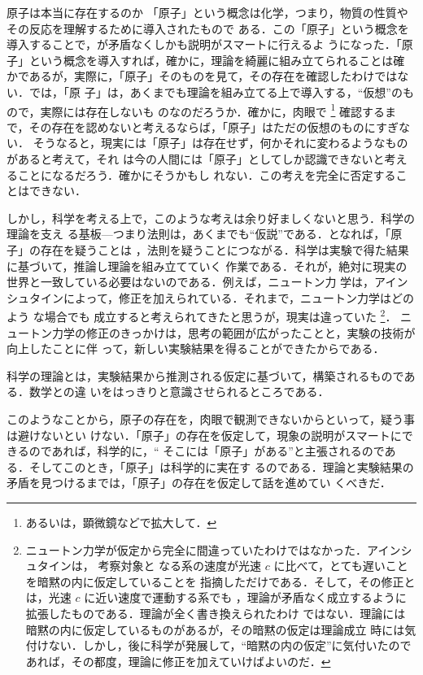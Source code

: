         \begin{memo}{原子は本当に存在するのか}
            「原子」という概念は化学，つまり，物質の性質やその反応を理解するために導入されたもので
            ある．この「原子」という概念を導入することで，が矛盾なくしかも説明がスマートに行えるよ
            うになった．「原子」という概念を導入すれば，確かに，理論を綺麗に組み立てられることは確
            かであるが，実際に，「原子」そのものを見て，その存在を確認したわけではない．では，「原
            子」は，あくまでも理論を組み立てる上で導入する，“仮想”のもので，実際には存在しないも
            のなのだろうか．確かに，肉眼で
                \footnote{
                    あるいは，顕微鏡などで拡大して．
                }
            確認するまで，その存在を認めないと考えるならば，「原子」はただの仮想のものにすぎない．
            そうなると，現実には「原子」は存在せず，何かそれに変わるようなものがあると考えて，それ
            は今の人間には「原子」としてしか認識できないと考えることになるだろう．確かにそうかもし
            れない．この考えを完全に否定することはできない．

            しかし，科学を考える上で，このような考えは余り好ましくないと思う．科学の理論を支え
            る基板---つまり法則は，あくまでも“仮説”である．となれば，「原子」の存在を疑うことは
            ，法則を疑うことにつながる．科学は実験で得た結果に基づいて，推論し理論を組み立てていく
            作業である．それが，絶対に現実の世界と一致している必要はないのである．例えば，ニュートン力
            学は，アインシュタインによって，修正を加えられている．それまで，ニュートン力学はどのよう
            な場合でも
            成立すると考えられてきたと思うが，現実は違っていた
                \footnote{
                    ニュートン力学が仮定から完全に間違っていたわけではなかった．アインシュタインは，
                    考察対象と
                    なる系の速度が光速 $c$ に比べて，とても遅いことを暗黙の内に仮定していることを
                    指摘しただけである．そして，その修正とは，光速 $c$ に近い速度で運動する系でも
                    ，理論が矛盾なく成立するように拡張したものである．理論が全く書き換えられたわけ
                    ではない．理論には暗黙の内に仮定しているものがあるが，その暗黙の仮定は理論成立
                    時には気付けない．しかし，後に科学が発展して，“暗黙の内の仮定”に気付いたので
                    あれば，その都度，理論に修正を加えていけばよいのだ．
                }．
            ニュートン力学の修正のきっかけは，思考の範囲が広がったことと，実験の技術が向上したことに伴
            って，新しい実験結果を得ることができたからである．

            科学の理論とは，実験結果から推測される仮定に基づいて，構築されるものである．数学との違
            いをはっきりと意識させられるところである．

            このようなことから，原子の存在を，肉眼で観測できないからといって，疑う事は避けないとい
            けない．「原子」の存在を仮定して，現象の説明がスマートにできるのであれば，科学的に，“
            そこには「原子」がある”と主張されるのである．そしてこのとき，「原子」は科学的に実在す
            るのである．理論と実験結果の矛盾を見つけるまでは，「原子」の存在を仮定して話を進めてい
            くべきだ．
        \end{memo}


